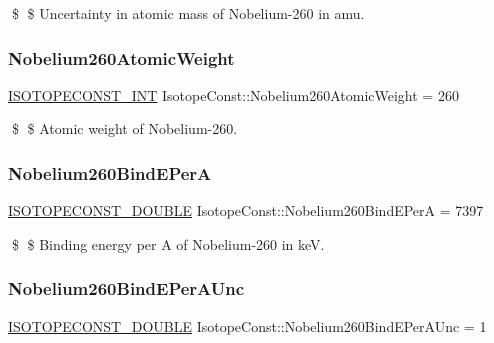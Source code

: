 \$ \$ Uncertainty in atomic mass of Nobelium-\/260 in amu. \mbox{\label{group___isotope_const-_nobelium-_no260_ga0998ab8c19dc9a0d0b51b9efe65b421f}} 
\subsubsection{\texorpdfstring{Nobelium260\+Atomic\+Weight}{Nobelium260AtomicWeight}}
{\footnotesize\ttfamily \mbox{\hyperlink{group___isotope_const-_macros_ga5f18360b3e99483a35c32d789e62621c}{I\+S\+O\+T\+O\+P\+E\+C\+O\+N\+S\+T\+\_\+\+I\+NT}} Isotope\+Const\+::\+Nobelium260\+Atomic\+Weight = 260}

\$ \$ Atomic weight of Nobelium-\/260. \mbox{\label{group___isotope_const-_nobelium-_no260_ga9fcd83c53ddaee8a6462dde69da9abb8}} 
\subsubsection{\texorpdfstring{Nobelium260\+Bind\+E\+PerA}{Nobelium260BindEPerA}}
{\footnotesize\ttfamily \mbox{\hyperlink{group___isotope_const-_macros_ga8f45a7272ce02c0b4c65c44636ed719a}{I\+S\+O\+T\+O\+P\+E\+C\+O\+N\+S\+T\+\_\+\+D\+O\+U\+B\+LE}} Isotope\+Const\+::\+Nobelium260\+Bind\+E\+PerA = 7397}

\$ \$ Binding energy per A of Nobelium-\/260 in keV. \mbox{\label{group___isotope_const-_nobelium-_no260_gaab92a8c9f9305ef87534bbba0165ab53}} 
\subsubsection{\texorpdfstring{Nobelium260\+Bind\+E\+Per\+A\+Unc}{Nobelium260BindEPerAUnc}}
{\footnotesize\ttfamily \mbox{\hyperlink{group___isotope_const-_macros_ga8f45a7272ce02c0b4c65c44636ed719a}{I\+S\+O\+T\+O\+P\+E\+C\+O\+N\+S\+T\+\_\+\+D\+O\+U\+B\+LE}} Isotope\+Const\+::\+Nobelium260\+Bind\+E\+Per\+A\+Unc = 1}

